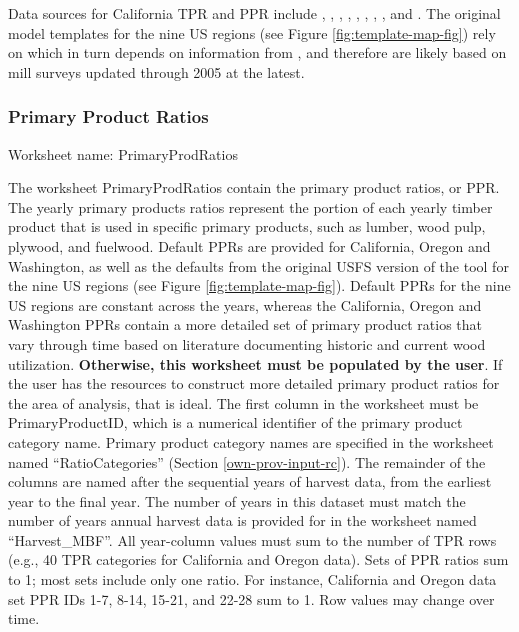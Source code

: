 \documentclass[
  openany]{book}
\begin{document}
Data sources for California TPR and PPR include \textcite{barrette1970}, \textcite{hiserote1978}, \textcite{howard1974}, \textcite{marcille2020}, \textcite{mciver2015}, \textcite{morgan2004}, \textcite{morgan2012}, \textcite{ward1995}, and \textcite{ward1997}. The original model templates for the nine US regions (see Figure \ref{fig:template-map-fig}) rely on \textcite{smith2006} which in turn depends on information from \textcite{adams2006}, and therefore are likely based on mill surveys updated through 2005 at the latest.

\hypertarget{own-prov-input-ppr}{%
\subsubsection{Primary Product Ratios}\label{own-prov-input-ppr}}

Worksheet name: PrimaryProdRatios

The worksheet PrimaryProdRatios contain the primary product ratios, or PPR. The yearly primary products ratios represent the portion of each yearly timber product that is used in specific primary products, such as lumber, wood pulp, plywood, and fuelwood. Default PPRs are provided for California, Oregon and Washington, as well as the defaults from the original USFS version of the tool for the nine US regions (see Figure \ref{fig:template-map-fig}). Default PPRs for the nine US regions are constant across the years, whereas the California, Oregon and Washington PPRs contain a more detailed set of primary product ratios that vary through time based on literature documenting historic and current wood utilization. \textbf{Otherwise, this worksheet must be populated by the user}. If the user has the resources to construct more detailed primary product ratios for the area of analysis, that is ideal. The first column in the worksheet must be PrimaryProductID, which is a numerical identifier of the primary product category name. Primary product category names are specified in the worksheet named ``RatioCategories'' (Section \ref{own-prov-input-rc}). The remainder of the columns are named after the sequential years of harvest data, from the earliest year to the final year. The number of years in this dataset must match the number of years annual harvest data is provided for in the worksheet named ``Harvest\_MBF''. All year-column values must sum to the number of TPR rows (e.g., 40 TPR categories for California and Oregon data). Sets of PPR ratios sum to 1; most sets include only one ratio. For instance, California and Oregon data set PPR IDs 1-7, 8-14, 15-21, and 22-28 sum to 1. Row values may change over time.
\end{document}

